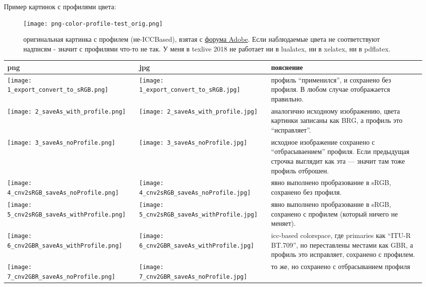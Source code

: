 Пример картинок с профилями цвета:

\begin{figure}[h]
  \centering
  \texttt{[image: png-color-profile-test\_orig.png]}
  \caption{оригинальная картинка с профилем (не-ICCBased), взятая с \href{https://forums.adobe.com/thread/1183489}{форума Adobe}. Если наблюдаемые цвета не соответствуют надписям - значит с профилями что-то не так.
  У меня в texlive 2018 не работает ни в lualatex, ни в xelatex, ни в pdflatex.}
  \label{img:orig pic with profile}
\end{figure}



\newlength{\picw}
\setlength{\picw}{3cm}
\clearpage
\begin{longtable}[c]{|b{\picw}|b{\picw}|b{8cm}|}
    \hline     %
    png & jpg & пояснение \\            
    \midrule
    \texttt{[image: 1\_export\_convert\_to\_sRGB.png]} & \texttt{[image: 1\_export\_convert\_to\_sRGB.jpg]} & 
    профиль \enquote{применился}, и сохранено без профиля. В любом случае отображается правильно. \\  
    \midrule
    \texttt{[image: 2\_saveAs\_with\_profile.png]} & \texttt{[image: 2\_saveAs\_with\_profile.jpg]} & 
    аналогично исходному изображению, цвета картинки записаны как BRG, а профиль это \enquote{исправляет}.
    \\  \midrule
    \texttt{[image: 3\_saveAs\_noProfile.png]} & \texttt{[image: 3\_saveAs\_noProfile.jpg]} & 
    исходное изображение сохранено с \enquote{отбрасываением} профиля. Если предыдущая строчка выглядит как эта --- значит там тоже профиль отброшен.
    \\  \midrule
    \texttt{[image: 4\_cnv2sRGB\_saveAs\_noProfile.png]} & \texttt{[image: 4\_cnv2sRGB\_saveAs\_noProfile.jpg]} & 
    явно выполнено пробразование в sRGB, сохранено без профиля.
    \\  \midrule
    \texttt{[image: 5\_cnv2sRGB\_saveAs\_withProfile.png]} & \texttt{[image: 5\_cnv2sRGB\_saveAs\_withProfile.jpg]} & 
    явно выполнено пробразование в sRGB, сохранено с профилем (который ничего не меняет).
    \\  \midrule
    \texttt{[image: 6\_cnv2GBR\_saveAs\_withProfile.png]} & \texttt{[image: 6\_cnv2GBR\_saveAs\_withProfile.jpg]} & 
    icc-based colorspace, где primaries как \enquote{ITU-R BT.709}, но переставлены местами как GBR, 
    а профиль это исправляет, сохранено с профилем.
    \\ \midrule
    \texttt{[image: 7\_cnv2GBR\_saveAs\_noProfile.png]} & \texttt{[image: 7\_cnv2GBR\_saveAs\_noProfile.jpg]} & 
    то же, но сохранено с отбрасыванием профиля
    \\
    \bottomrule %
\end{longtable}%


